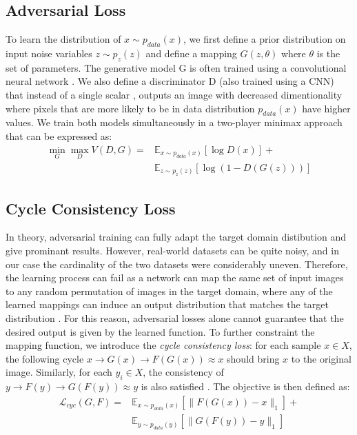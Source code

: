 \documentclass[10pt,twocolumn,letterpaper]{article}
\begin{document}
\subsection{Adversarial Loss}
To learn the distribution of $x \sim p_{data}(x)$, we first define a prior distribution on input noise variables $z \sim p_{z}(z)$ and define a mapping $G(z,\theta)$ where $\theta$ is the set of parameters. The generative model G is often trained using a convolutional neural network \cite{cnn}. We also define a discriminator D (also trained using a CNN) that instead of a single scalar \cite{simplegan}, outputs an image with decreased dimentionality where pixels that are more likely to be in data distribution $p_{data}(x)$ have higher values. We train both models simultaneously in a two-player minimax approach that can be expressed as:
\begin{equation}
	\begin{split}
		\min_G \max_D V(D,G) = &\mathbb{E}_{x \sim p_{data}(x)}[\log{D(x)}]+ \\
		&\mathbb{E}_{z \sim p_{z}(z)}[\log{(1-D(G(z)))}]
	\end{split}
\end{equation}

\subsection{Cycle Consistency Loss}
In theory, adversarial training can fully adapt the target domain distibution and give prominant results. However, real-world datasets can be quite noisy, and in our case the cardinality of the two datasets were considerably uneven. Therefore, the learning process can fail as a network can map the same set of input images to any random permutation of images in the target domain, where any of the learned mappings can induce an output distribution that matches the target distribution \cite{cyclegan}. For this reason, adversarial losses alone cannot guarantee that the desired output is given by the learned function. To further constraint the mapping function, we introduce the \emph{cycle consistency loss}: for each sample $x \in X$, the following cycle $x \rightarrow G(x)\rightarrow F(G(x)) \approx x$ should bring $x$ to the original image. Similarly, for each $y_{i}\in X$, the consistency of $y \rightarrow F(y)\rightarrow G(F(y)) \approx y$ is also satisfied \cite{cyclegan}. The objective is then defined as:
\begin{equation}
	\begin{split}
		\mathcal{L}_{cyc}(G,F) = & \mathbb{E}_{x \sim p_{data}(x)} [\| F(G(x))-x \| _1] + \\
				& \mathbb{E}_{y \sim p_{data}(y)} [\| G(F(y))-y \| _1]
	\end{split}
\end{equation}
\end{document}
